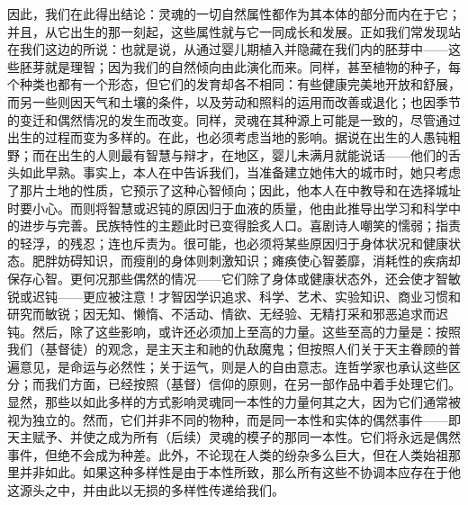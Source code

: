 因此，我们在此得出结论：灵魂的一切自然属性都作为其本体的部分而内在于它；并且，从它出生的那一刻起，这些属性就与它一同成长和发展。正如我们常发现站在我们这边的所说：也就是说，从通过婴儿期植入并隐藏在我们内的胚芽中——这些胚芽就是理智；因为我们的自然倾向由此演化而来。同样，甚至植物的种子，每个种类也都有一个形态，但它们的发育却各不相同：有些健康完美地开放和舒展，而另一些则因天气和土壤的条件，以及劳动和照料的运用而改善或退化；也因季节的变迁和偶然情况的发生而改变。同样，灵魂在其种源上可能是一致的，尽管通过出生的过程而变为多样的。在此，也必须考虑当地的影响。据说在出生的人愚钝粗野；而在出生的人则最有智慧与辩才，在地区，婴儿未满月就能说话——他们的舌头如此早熟。事实上，本人在中告诉我们，当准备建立她伟大的城市时，她只考虑了那片土地的性质，它预示了这种心智倾向；因此，他本人在中教导和在选择城址时要小心。而则将智慧或迟钝的原因归于血液的质量，他由此推导出学习和科学中的进步与完善。民族特性的主题此时已变得脍炙人口。喜剧诗人嘲笑的懦弱；指责的轻浮，的残忍；连也斥责为。很可能，也必须将某些原因归于身体状况和健康状态。肥胖妨碍知识，而瘦削的身体则刺激知识；瘫痪使心智萎靡，消耗性的疾病却保存心智。更何况那些偶然的情况——它们除了身体或健康状态外，还会使才智敏锐或迟钝——更应被注意！才智因学识追求、科学、艺术、实验知识、商业习惯和研究而敏锐；因无知、懒惰、不活动、情欲、无经验、无精打采和邪恶追求而迟钝。然后，除了这些影响，或许还必须加上至高的力量。这些至高的力量是：按照我们（基督徒）的观念，是主天主和祂的仇敌魔鬼；但按照人们关于天主眷顾的普遍意见，是命运与必然性；关于运气，则是人的自由意志。连哲学家也承认这些区分；而我们方面，已经按照（基督）信仰的原则，在另一部作品中着手处理它们。显然，那些以如此多样的方式影响灵魂同一本性的力量何其之大，因为它们通常被视为独立的。然而，它们并非不同的物种，而是同一本性和实体的偶然事件——即天主赋予、并使之成为所有（后续）灵魂的模子的那同一本性。它们将永远是偶然事件，但绝不会成为种差。此外，不论现在人类的纷杂多么巨大，但在人类始祖那里并非如此。如果这种多样性是由于本性所致，那么所有这些不协调本应存在于他这源头之中，并由此以无损的多样性传递给我们。\par



